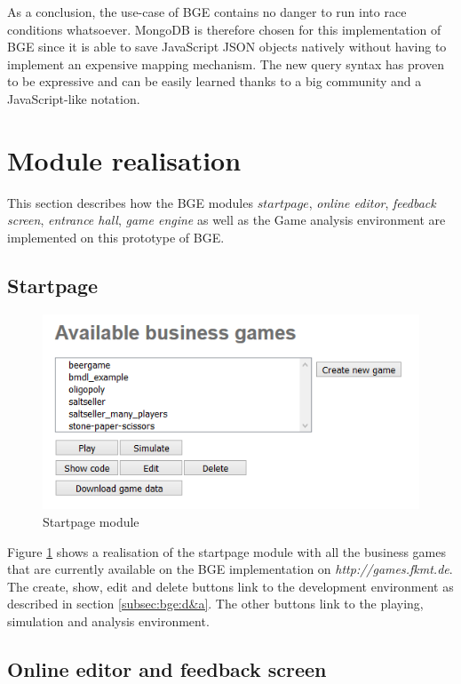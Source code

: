 As a conclusion, the use-case of BGE contains no danger to run into race conditions whatsoever. MongoDB is therefore chosen for this implementation of BGE since it is able to save JavaScript JSON objects natively without having to implement an expensive mapping mechanism. The new query syntax has proven to be expressive and can be easily learned thanks to a big community and a JavaScript-like notation. 

\section{Module realisation}
\label{sec:imp:realisation}

This section describes how the BGE modules $startpage$, \textit{online editor}, \textit{feedback screen}, \textit{entrance hall}, \textit{game engine} as well as the Game analysis environment are implemented on this prototype of BGE.

\subsection{Startpage}
\label{sub:module:startpage}

\begin{figure}
	\centering
	\includegraphics[scale=1]{figures/startpage.png}
	\caption{Startpage module}
	\label{fig:startpage}
\end{figure}

Figure \ref{fig:startpage} shows a realisation of the startpage module with all the business games that are currently available on the BGE implementation on \textit{http://games.fkmt.de}. The create, show, edit and delete buttons link to the development environment as described in section \ref{subsec:bge:d&a}. The other buttons link to the playing, simulation and analysis environment.

\subsection{Online editor and feedback screen}
\label{sub:module:editor}

